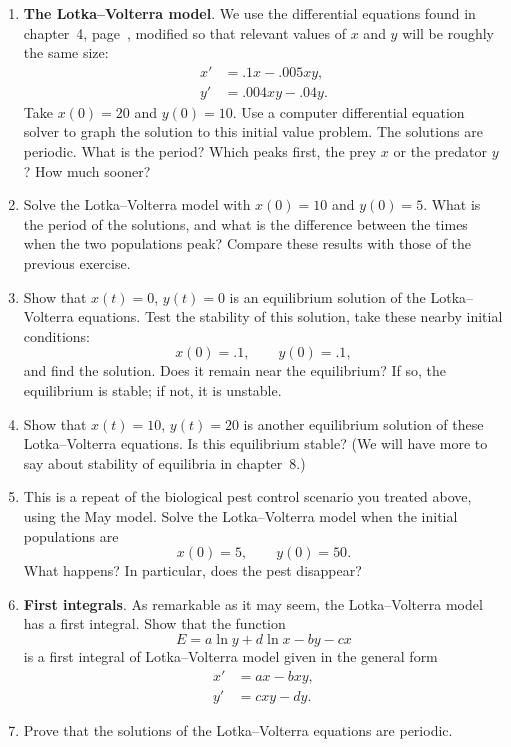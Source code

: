 \begin{enumerate}
\item {\bf The Lotka--Volterra model}. We
use the differential equations found in chapter~4,
page~\pageref{L-V}, modified so that relevant values of $x$
and $y$ will be roughly the same size:
\begin{align*}
x' &= .1 x - .005 xy, \\
y' &= .004 xy - .04 y.
\end{align*}
Take $x(0) = 20$ and $y(0) = 10$.  Use a computer differential
equation solver to graph the solution to this initial value problem.
The solutions are periodic.  What is the period?  Which peaks first,
the prey $x$ or the predator $y$?  How much sooner?


\item Solve the Lotka--Volterra model with $x(0) = 10$ and $y(0) = 5$.
What is the period of the solutions, and what is the difference
between the times when the two populations peak?  Compare these
results with those of the previous exercise.


\item Show that $x(t) = 0$, $y(t) = 0$ is an equilibrium solution of
the Lotka--Volterra equations.  Test the stability of this solution,
take these nearby initial conditions:
	\[
x(0) = .1, \qquad y(0) = .1,
\]
and find the solution.  Does it remain near the equilibrium?  If so,
the equilibrium is stable; if not, it is unstable.


\item Show that $x(t) = 10$, $y(t) = 20$ is another equilibrium
solution of these Lotka--Volterra equations.  Is this equilibrium
stable?  (We will have more to say about stability of equilibria in
chapter~8.)


\item This is a repeat of the biological pest control scenario you
treated above, using the May model.  Solve the Lotka--Volterra model
when the initial populations are
	\[
x(0) = 5, \qquad y (0) = 50.
\]
What happens?  In particular, does the pest disappear?


\item {\bf First integrals}.\label{L-V first int} As remarkable as it
may seem, the Lotka--Volterra model has a first integral.  Show that
the function
	\[
E = a \ln{y} + d \ln{x} - b y - c x
\]
is a first integral of Lotka--Volterra model given in the general form
\begin{align*}
x' &= a x - b xy, \\
y' &= c xy - d y.
\end{align*}


\item Prove that the solutions of the Lotka--Volterra equations are
periodic.

\end{enumerate}
